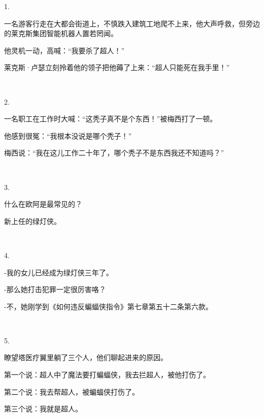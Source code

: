 1.

一名游客行走在大都会街道上，不慎跌入建筑工地爬不上来，他大声呼救，但旁边的莱克斯集团智能机器人置若罔闻。

他灵机一动，高喊：“我要杀了超人！”

莱克斯·卢瑟立刻拎着他的领子把他薅了上来：“超人只能死在我手里！”

~\

2.

一名职工在工作时大喊：“这秃子真不是个东西！”被梅西打了一顿。

他感到很冤：“我根本没说是哪个秃子！”

梅西说：“我在这儿工作二十年了，哪个秃子不是东西我还不知道吗？”

~\

3.

什么在欧阿是最常见的？

新上任的绿灯侠。

~\

4.

-我的女儿已经成为绿灯侠三年了。

-那么她打击犯罪一定很厉害咯？

-不，她刚学到《如何违反蝙蝠侠指令》第七章第五十二条第六款。

~\

5.

瞭望塔医疗翼里躺了三个人，他们聊起进来的原因。

第一个说：超人中了魔法要打蝙蝠侠，我去拦超人，被他打伤了。

第二个说：我去帮超人，被蝙蝠侠打伤了。

第三个说：我就是超人。